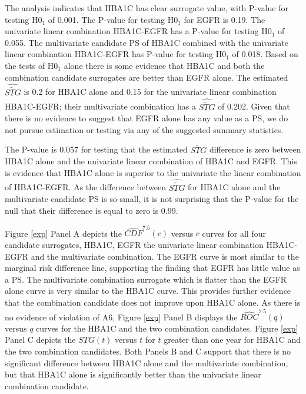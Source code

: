 \documentclass[times, doublespace]{simauth}
\begin{document}
The analysis indicates that HBA1C has clear surrogate value, with P-value for testing H0$_1$ of 0.001. The P-value for testing H0$_1$ for EGFR is 0.19. The univariate linear combination HBA1C-EGFR has a P-value for testing H0$_1$ of 0.055. The multivariate candidate PS of HBA1C combined with the univariate linear combination HBA1C-EGFR has P-value for testing H0$_1$ of 0.018. Based on the tests of H0$_1$ alone there is some evidence that HBA1C and both the combination candidate surrogates are better than EGFR alone. The estimated $\widehat{\widetilde{STG}}$ is 0.2 for HBA1C alone and 0.15 for the univariate linear combination HBA1C-EGFR; their multivariate combination has a $\widehat{\widetilde{STG}}$ of 0.202. Given that there is no evidence to suggest that EGFR alone has any value as a PS, we do not pursue estimation or testing via any of the suggested summary statistics.

The P-value is 0.057 for testing that the estimated $\widetilde{STG}$ difference is zero between HBA1C alone and the univariate linear combination of HBA1C and EGFR. This is evidence that HBA1C alone is superior to the univariate the linear combination of HBA1C-EGFR. As the difference between $\widehat{\widetilde{STG}}$ for HBA1C alone and the multivariate candidate PS is so small, it is not surprising that the P-value for the null that their difference is equal to zero is 0.99. 

Figure \ref{exp} Panel A depicts the $\widehat{CDF}^{7.5}(c)$ versus $c$ curves for all four candidate surrogates, HBA1C, EGFR the univariate linear combination HBA1C-EGFR and the multivariate combination. The EGFR curve is most similar to the marginal risk difference line, supporting the finding that EGFR has little value as a PS. The multivariate combination surrogate which is flatter than the EGFR alone curve is very similar to the HBA1C curve. This provides further evidence that the combination candidate does not improve upon HBA1C alone. As there is no evidence of violation of A6, Figure \ref{exp} Panel B displays the $\widehat{ROC}^{7.5}(q)$ versus $q$ curves for the HBA1C and the two combination candidates. Figure \ref{exp} Panel C depicts the $STG(t)$ versus $t$ for $t$ greater than one year for HBA1C and the two combination candidates. Both Panels B and C support that there is no significant difference between HBA1C alone and the multivariate combination, but that HBA1C alone is significantly better than the univariate linear combination candidate.
\end{document}
